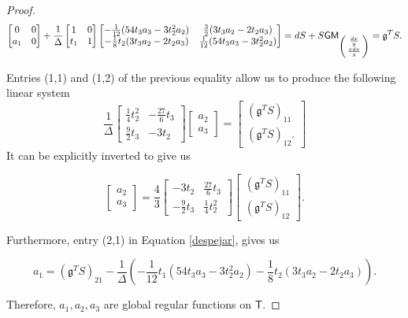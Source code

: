 \documentclass{article}
\numberwithin{equation}{section}
\numberwithin{figure}{section}
\theoremstyle{plain}
\theoremstyle{definition}
\numberwithin{equation}{section}
\newtheorem[S, bodystyle=\normalfont\noindent]{defiS}{Definition}[section]
\begin{document}
\begin{proof}
\begin{equation}\label{despejar}
\begin{bmatrix}
0 & 0\\
a_1 & 0
\end{bmatrix}
+\frac{1}{\Delta}\begin{bmatrix}
1 & 0\\
t_1 & 1
\end{bmatrix}
\begin{bmatrix}
-\frac{1}{12}(54t_3a_3-3t_2^2a_2) & \frac{3}{2}(3t_3a_2-2t_2a_3)\\
-\frac{1}{8}t_2(3t_3a_2-2t_2a_3) & \frac{1}{12}(54t_3a_3-3t_2^2a_2)
\end{bmatrix}=dS+S\mathsf{GM}_{\begin{psmallmatrix}\frac{dx}{y}\\ \frac{xdx}{y}\end{psmallmatrix}}=\mathfrak{g}^TS.
\end{equation}

Entries (1,1) and (1,2) of the previous equality allow us to produce the following linear system
\begin{equation}
\frac{1}{\Delta}\begin{bmatrix}
\frac{1}{4}t_2^2 & -\frac{27}{6}t_3\\
\frac{9}{2}t_3 & -3t_2
\end{bmatrix}\begin{bmatrix}
a_2 \\
a_3
\end{bmatrix}=\begin{bmatrix}
(\mathfrak{g}^TS)_{11}\\
(\mathfrak{g}^TS)_{12}.
\end{bmatrix}
\end{equation}
It can be explicitly inverted to give us 

\begin{equation}
\begin{bmatrix}
a_2 \\
a_3
\end{bmatrix}=\frac{4}{3}\begin{bmatrix}
-3t_2 & \frac{27}{6}t_3\\
-\frac{9}{2}t_3 & \frac{1}{4}t_2^2
\end{bmatrix}\begin{bmatrix}
(\mathfrak{g}^TS)_{11}\\
(\mathfrak{g}^TS)_{12}
\end{bmatrix}.
\end{equation}

Furthermore, entry (2,1) in Equation \ref{despejar}, gives us 

\begin{equation}a_1=(\mathfrak{g}^TS)_{21}-\frac{1}{\Delta}(-\frac{1}{12}t_1(54t_3a_3-3t_2^2a_2)-\frac{1}{8}t_2(3t_3a_2-2t_2a_3)).
\end{equation}

Therefore, $a_1,a_2,a_3$ are global regular functions on $\mathsf{T}$.
\end{proof}
\end{document}
